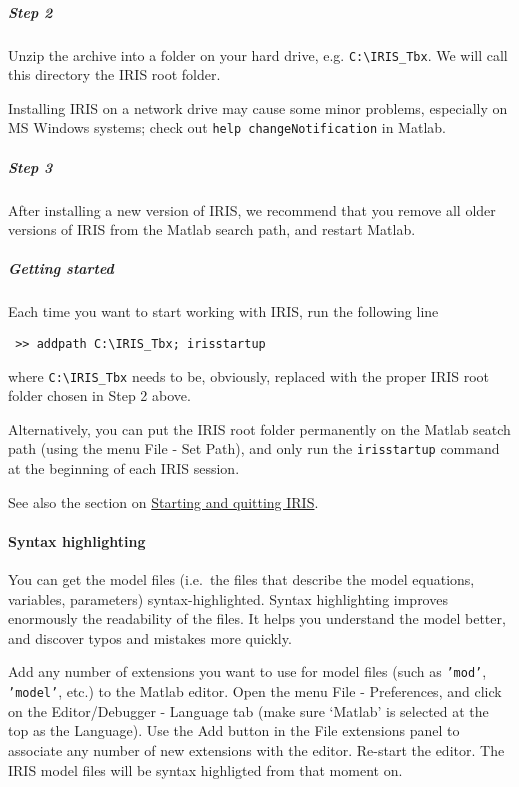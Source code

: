  \subparagraph{Step 2}
 
 Unzip the archive into a folder on your hard drive, e.g.
 \texttt{C:\textbackslash{}IRIS\_Tbx}. We will call this directory the
 IRIS root folder.
 
 Installing IRIS on a network drive may cause some minor problems,
 especially on MS Windows systems; check out
 \texttt{help changeNotification} in Matlab.
 
 \subparagraph{Step 3}
 
 After installing a new version of IRIS, we recommend that you remove all
 older versions of IRIS from the Matlab search path, and restart Matlab.
 
 \subparagraph{Getting started}
 
 Each time you want to start working with IRIS, run the following line
 
 \begin{verbatim}
 >> addpath C:\IRIS_Tbx; irisstartup
 \end{verbatim}
 
 where \texttt{C:\textbackslash{}IRIS\_Tbx} needs to be, obviously,
 replaced with the proper IRIS root folder chosen in Step 2 above.
 
 Alternatively, you can put the IRIS root folder permanently on the
 Matlab seatch path (using the menu File - Set Path), and only run the
 \texttt{irisstartup} command at the beginning of each IRIS session.
 
 See also the section on \href{config/Contents}{Starting and quitting
 IRIS}.
 
 \paragraph{Syntax highlighting}
 
 You can get the model files (i.e.~the files that describe the model
 equations, variables, parameters) syntax-highlighted. Syntax
 highlighting improves enormously the readability of the files. It helps
 you understand the model better, and discover typos and mistakes more
 quickly.
 
 Add any number of extensions you want to use for model files (such as
 \texttt{'mod'}, \texttt{'model'}, etc.) to the Matlab editor. Open the
 menu File - Preferences, and click on the Editor/Debugger - Language tab
 (make sure `Matlab' is selected at the top as the Language). Use the Add
 button in the File extensions panel to associate any number of new
 extensions with the editor. Re-start the editor. The IRIS model files
 will be syntax highligted from that moment on.




